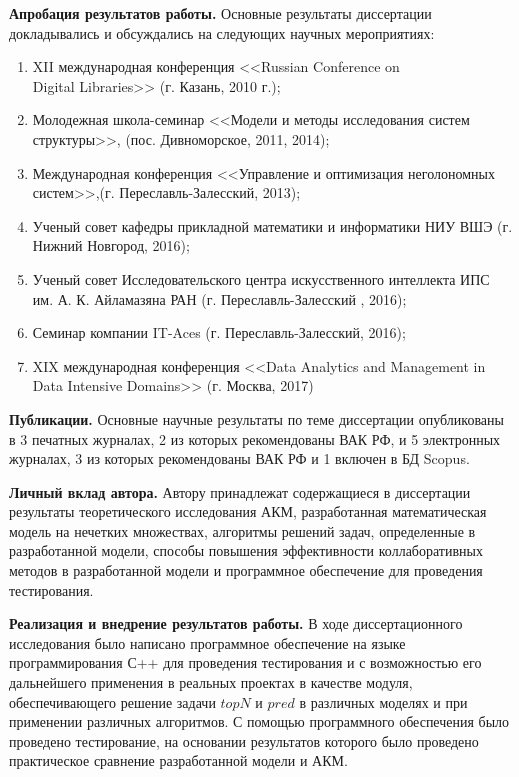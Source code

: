 {\bf Апробация результатов работы.}
Основные результаты диссертации докладывались и обсуждались на следующих научных мероприятиях:
\begin{enumerate}
\item XII международная конференция <<Russian Conference on \\Digital Libraries>>
	(г. Казань, 2010 г.);
\item Молодежная школа-семинар <<Модели и методы исследования систем
	структуры>>, (пос. Дивноморское, 2011, 2014);
\item Международная конференция <<Управление и оптимизация неголономных
	систем>>,(г. Переславль-Залесский, 2013);
\item Ученый совет кафедры прикладной математики и информатики
	НИУ ВШЭ (г. Нижний Новгород, 2016);
\item Ученый совет Исследовательского центра искусственного интеллекта
	ИПС им. А. К. Айламазяна РАН (г. Переславль-Залесский , 2016);
\item Семинар компании IT-Aces (г. Переславль-Залесский, 2016);
\item XIX международная конференция <<Data Analytics and Management in Data
	Intensive Domains>> (г. Москва, 2017)
\end{enumerate}

{\bf Публикации.} Основные научные результаты по теме диссертации опубликованы
в 3 печатных журналах, 2 из которых рекомендованы ВАК РФ, и 5 электронных
журналах, 3 из которых рекомендованы ВАК РФ и 1 включен в БД Scopus.

{\bf Личный вклад автора.} Автору принадлежат содержащиеся в
диссертации результаты теоретического исследования АКМ,
разработанная математическая модель на нечетких множествах,
алгоритмы решений задач, определенные в разработанной модели,
способы повышения эффективности коллаборативных методов в разработанной модели
и программное обеспечение для проведения тестирования.

{\bf Реализация и внедрение результатов работы.}
В ходе диссертационного
исследования было написано программное обеспечение на
языке программирования С++ для проведения тестирования и с возможностью
его дальнейшего применения в реальных проектах в качестве модуля,
обеспечивающего решение задачи $topN$ и $pred$ в различных моделях и
при применении различных алгоритмов. С помощью программного обеспечения
было проведено тестирование, на основании результатов которого
было проведено практическое сравнение разработанной модели и АКМ.

